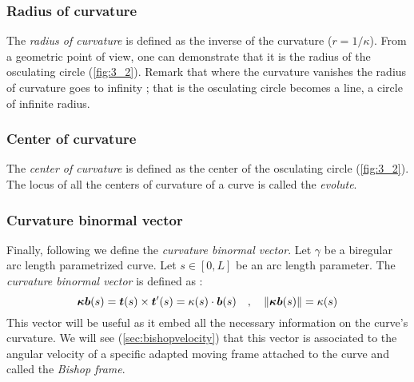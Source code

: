 \subsubsection{Radius of curvature}
The \emph{radius of curvature} is defined as the inverse of the curvature ($r= 1/\kappa$). From a geometric point of view, one can demonstrate that it is the radius of the osculating circle (\cref{fig:3_2}). Remark that where the curvature vanishes the radius of curvature goes to infinity ; that is the osculating circle becomes a line, a circle of infinite radius.

\subsubsection{Center of curvature}
The \emph{center of curvature} is defined as the center of the osculating circle (\cref{fig:3_2}). The locus of all the centers of curvature of a curve is called the \emph{evolute}.

\subsubsection{Curvature binormal vector}
Finally, following \cite{Bergou2008} we define the \emph{curvature binormal vector}. Let $\gamma$ be a biregular arc length parametrized curve. Let $s\in [0,L]$ be an arc length parameter. The \emph{curvature binormal vector} is defined as :
\begin{equation}
	\boldsymbol{\kappa b}(s) = \boldsymbol{t}(s) \times \boldsymbol{t}'(s) = \kappa(s)\cdot\boldsymbol{b}(s)
	\quad,\quad
	\lVert\boldsymbol{\kappa b}(s)\rVert= \kappa(s)
\label{eq:kb}
\end{equation}
This vector will be useful as it embed all the necessary information on the curve's curvature. We will see (\cref{sec:bishopvelocity}) that this vector is associated to the angular velocity of a specific adapted moving frame attached to the curve and called the \emph{Bishop frame}.

